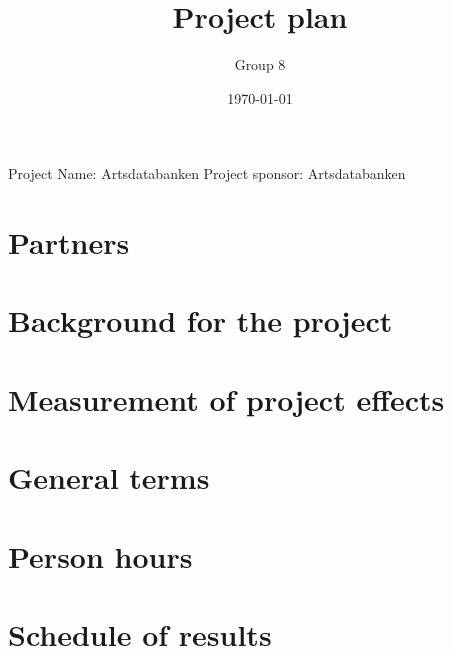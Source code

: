 \documentclass[a4paper]{article}
\begin{document}
	\title{Project plan}
	\author{Group 8}
	\date{\today}
	\maketitle

	Project Name: Artsdatabanken
	Project sponsor: Artsdatabanken

	\section{Partners}

	\section{Background for the project}

	\section{Measurement of project effects}

	\section{General terms}

	\section{Person hours}

	\section{Schedule of results}
\end{document}
